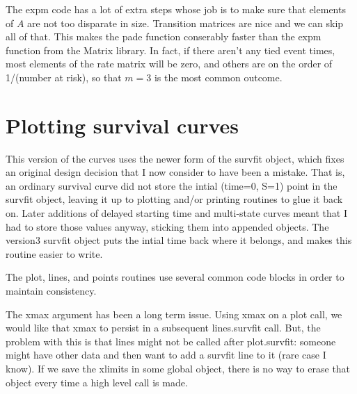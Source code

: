 \documentclass{article}
\begin{document}
The expm code has a lot of extra steps whose job is to make sure that elements
of $A$ are not too disparate in size.  Transition matrices are nice and we can
skip all of that.  This makes the pade function conserably faster than the
expm function from the Matrix library.  In fact, if there aren't any
tied event times, most elements of the rate matrix will be zero, and 
others are on the order of 1/(number at risk), so that $m=3$ is the most common
outcome. 
\section{Plotting survival curves}
This version of the curves uses the newer form of the survfit object, which
fixes an original design decision that I now consider to have been a mistake.
That is, an ordinary survival curve did not store the intial (time=0, S=1)
point in the survfit object, leaving it up to plotting and/or printing routines
to glue it back on.  
Later additions of delayed starting time and multi-state curves meant that I
had to store those values anyway, sticking them into appended objects.
The version3 survfit object puts the intial time back where it belongs, and
makes this routine easier to write.

The plot, lines, and points routines use several common code blocks in order to 
maintain consistency.

The xmax argument has been a long term issue.  Using xmax on a plot call, we
would like that xmax to persist in a subsequent lines.survfit call.  
But, the problem with this is that lines might not be called after plot.survfit:
someone might have other data and then want to add a survfit line to it (rare
case I know).  If we save the xlimits in some global object, there is no way
to erase that object every time a high level call is made.  
\end{document}

